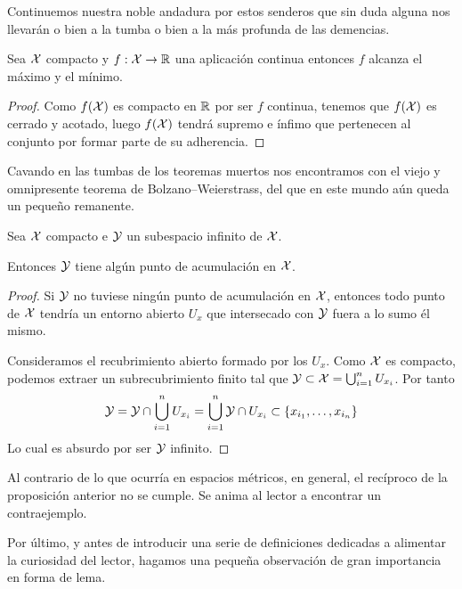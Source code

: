 Continuemos nuestra noble andadura por estos senderos que sin duda alguna nos llevarán o bien a la tumba o bien a la más profunda de las demencias.
\begin{prop}[Weierstrass]\label{comp_prop_weierstrass}
	Sea $\mathcal{X}$ compacto y $f:\mathcal{X}\to\mathbb{R}$ una aplicación continua entonces $f$ alcanza el máximo y el mínimo.
\end{prop}
\begin{proof}
	Como $f(\mathcal{X})$ es compacto en $\mathbb{R}$ por ser $f$ continua, tenemos que $f(\mathcal{X})$ es cerrado y acotado, luego $f(\mathcal{X})$ tendrá supremo e ínfimo que pertenecen al conjunto por formar parte de su adherencia.
\end{proof}

Cavando en las tumbas de los teoremas muertos nos encontramos con el viejo y omnipresente teorema de Bolzano--Weierstrass, del que en este mundo aún queda un pequeño remanente.

\begin{prop}
		Sea $\mathcal{X}$ compacto e $\mathcal{Y}$ un subespacio infinito de $\mathcal{X}$.
		
		Entonces $\mathcal{Y}$ tiene algún punto de acumulación en $\mathcal{X}$.
\end{prop}
\begin{proof}
	Si $\mathcal{Y}$ no tuviese ningún punto de acumulación en $\mathcal{X}$, entonces todo punto de $\mathcal{X}$ tendría un entorno abierto $U_x$ que intersecado con $\mathcal{Y}$ fuera a lo sumo él mismo.
	
	Consideramos el recubrimiento abierto formado por los $U_x$. Como $\mathcal{X}$ es compacto, podemos extraer un subrecubrimiento finito tal que $\mathcal{Y}\subset \mathcal{X}=\bigcup_{i=1}^nU_{x_i}$. Por tanto \[\mathcal{Y}=\mathcal{Y}\cap\bigcup_{i=1}^nU_{x_i}=\bigcup_{i=1}^n\mathcal{Y}\cap U_{x_i}\subset\{x_{i_1},\dots,x_{i_n}\}\]
	Lo cual es absurdo por ser $\mathcal{Y}$ infinito.
\end{proof}

\begin{obs}[Recíproco]
	Al contrario de lo que ocurría en espacios métricos, en general, el recíproco de la proposición anterior no se cumple. Se anima al lector a encontrar un contraejemplo.
\end{obs}

Por último, y antes de introducir una serie de definiciones dedicadas a alimentar la curiosidad del lector, hagamos una pequeña observación de gran importancia en forma de lema.

